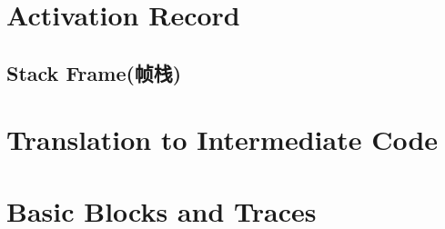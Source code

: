 \newpage
\section{Activation Record}
\subsection{Stack Frame(帧栈)}



\newpage
\section{Translation to Intermediate Code}




\newpage
\section{Basic Blocks and Traces}